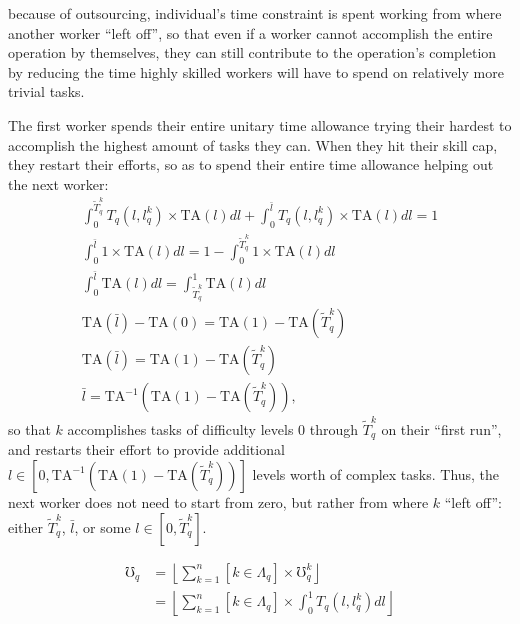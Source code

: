 \documentclass[hidelinks, nonatbib]{elsarticle}
\begin{document}
because of outsourcing, individual's time constraint is spent working from where another worker ``left off'', so that even if a worker cannot accomplish the entire operation by themselves, they can still contribute to the operation's completion by reducing the time highly skilled workers will have to spend on relatively more trivial tasks.

The first worker spends their entire unitary time allowance trying their hardest to accomplish the highest amount of tasks they can. When they hit their skill cap, they restart their efforts, so as to spend their entire time allowance helping out the next worker:
\begin{gather*}
    \int_{0}^{\tilde{T}_{q}^{k}}{
        T_{q}(l,l_{q}^{k})
        \times
        \text{TA}(l)
        dl
    }
    +
    \int_{0}^{\bar{l}}{
        T_{q}(l,l_{q}^{k})
        \times
        \text{TA}(l)
        dl
    }
    = 1
    \\
    \int_{0}^{\bar{l}}{
        1
        \times
        \text{TA}(l)
        dl
    }
    = 1 -
    \int_{0}^{\tilde{T}_{q}^{k}}{
        1
        \times
        \text{TA}(l)
        dl
    }
    \\
    \int_{0}^{\bar{l}}{
        \text{TA}(l)
        dl
    }
    = 
    \int_{\tilde{T}_{q}^{k}}^{1}{
        \text{TA}(l)
        dl
    }
    \\
    \text{TA}(\bar{l}) -
    \text{TA}(0)
    = 
    \text{TA}(1) -
    \text{TA}(\tilde{T}_{q}^{k})
    \\
    \text{TA}(\bar{l})
    = 
    \text{TA}(1) -
    \text{TA}(\tilde{T}_{q}^{k})
    \\
    \bar{l}
    = 
    \text{TA}^{-1}
    \left(
        \text{TA}(1) -
        \text{TA}(\tilde{T}_{q}^{k})
    \right)
    ,
\end{gather*}
so that $k$ accomplishes tasks of difficulty levels $0$ through $\tilde{T}_{q}^{k}$ on their ``first run'', and restarts their effort to provide additional $l \in \left[0,\text{TA}^{-1}
\left(
    \text{TA}(1) -
    \text{TA}(\tilde{T}_{q}^{k})
\right)
\right]$ levels worth of complex tasks. Thus, the next worker does not need to start from zero, but rather from where $k$ ``left off'': either $\tilde{T}_{q}^{k}$, $\bar{l}$, or some $l \in [0, \tilde{T}_{q}^{k}]$.
        
\begin{align*}
    \mho_q 
    &= 
    \left\lfloor
    \sum_{k=1}^{n}{
        [k \in \Lambda_q]
        \times
        \mho_{q}^{k}
    }
    \right\rfloor
    \\
    &= 
    \left\lfloor
    \sum_{k=1}^{n}{
        [k \in \Lambda_q]
        \times
        \int_{0}^{1}{
            T_{q}(l,l_{q}^{k})
            dl
        }
    }
    \right\rfloor
\end{align*}
\end{document}
